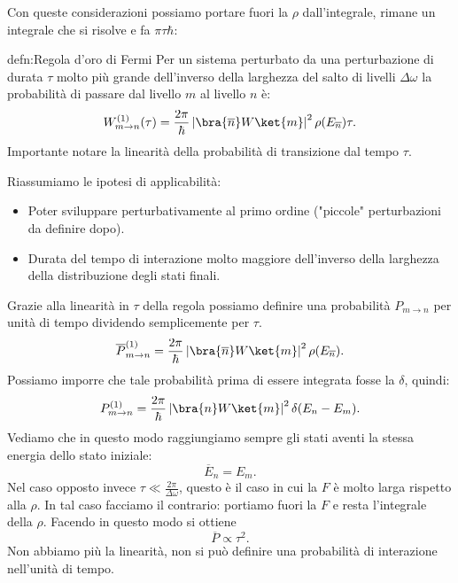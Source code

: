 \noindent
Con queste considerazioni possiamo portare fuori la $\rho$ dall'integrale, rimane un integrale che si risolve e fa $\pi \tau \hbar $:
\begin{defn}{defn:Regola d'oro di Fermi}
    Per un sistema perturbato da una perturbazione di durata $\tau$ molto più grande dell'inverso della larghezza del salto di livelli $\Delta\omega$  la probabilità di passare dal livello $m$ al livello $n$ è:
\[
    W^{(1)}_{m\to n}(\tau) =
    \frac{2\pi}{\hbar}\left|\bra{\overline{n}}W \ket{m}\right|^2\rho(E_{\overline{n}})\tau 
.\] 
Importante notare la linearità della probabilità di transizione dal tempo $\tau$.
\end{defn}
Riassumiamo le ipotesi di applicabilità:
\begin{itemize}
    \item Poter sviluppare perturbativamente al primo ordine ("piccole" perturbazioni da definire dopo).
    \item Durata del tempo di interazione molto maggiore dell'inverso della larghezza della distribuzione degli stati finali.
\end{itemize}
Grazie alla linearità in $\tau$ della regola possiamo definire una probabilità $P_{m\to n}$ per unità di tempo dividendo semplicemente per $\tau$.
\[
    \overline{P}_{m\to n}^{(1) } =
    \frac{2\pi}{\hbar}\left|\bra{\overline{n}}W \ket{m}\right|^2\rho(E_{\overline{n}})
.\] 
Possiamo imporre che tale probabilità prima di essere integrata fosse la $\delta$, quindi:
\[
    P_{m\to n}^{(1) } =
    \frac{2\pi}{\hbar}\left|\bra{n}W \ket{m}\right|^2\delta (E_n-E_m) 
.\] 
Vediamo che in questo modo raggiungiamo sempre gli stati aventi la stessa energia dello stato iniziale:
\[
    \overline{E}_n = E_m
.\] 
Nel caso opposto invece $\tau\ll\frac{2\pi }{\Delta\omega}$, questo è il caso in cui la $F$ è molto larga rispetto alla $\rho$.
In tal caso facciamo il contrario: portiamo fuori la $F$ e resta l'integrale della $\rho$. Facendo in questo modo si ottiene 
\[
\overline{P} \propto \tau^2
.\] 
Non abbiamo più la linearità, non si può definire una probabilità di interazione nell'unità di tempo.
